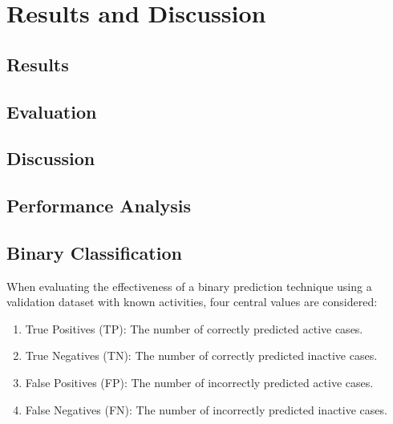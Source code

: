 \chapter{Results and Discussion}\label{chap:results_discussion}
\section{Results}\label{sec:results}
\section{Evaluation}\label{sec:evaluation}
\section{Discussion}\label{sec:discussion}
\section{Performance Analysis}\label{sec:performance_analysis}
\section{Binary Classification}\label{sec:binary_classification}
When evaluating the effectiveness of a binary prediction technique using a validation dataset with known activities, four central values are considered:

\begin{enumerate}
  \item True Positives (TP): The number of correctly predicted active cases.
  \item True Negatives (TN): The number of correctly predicted inactive cases.
  \item False Positives (FP): The number of incorrectly predicted active cases.
  \item False Negatives (FN): The number of incorrectly predicted inactive cases.
\end{enumerate}